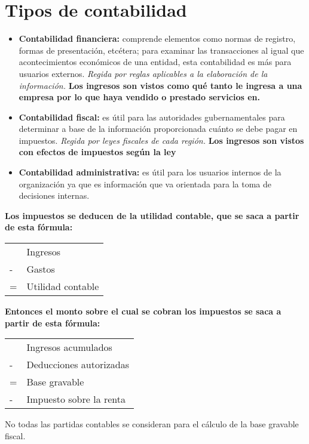 \documentclass{article}
\begin{document}
\section{Tipos de contabilidad}
\begin{itemize}
    \item \textbf{Contabilidad financiera:} comprende elementos como normas de registro, formas de presentación, etcétera; para examinar las transacciones al igual que acontecimientos económicos de una entidad, esta contabilidad es más para usuarios externos. \emph{Regida por reglas aplicables a la elaboración de la información.} \textbf{Los ingresos son vistos como qué tanto le ingresa a una empresa por lo que haya vendido o prestado servicios en.}
    \item \textbf{Contabilidad fiscal:} es útil para las autoridades gubernamentales para determinar a base de la información proporcionada cuánto se debe pagar en impuestos. \emph{Regida  por leyes fiscales de cada región.} \textbf{Los ingresos son vistos con efectos de impuestos según la ley}   
    \item \textbf{Contabilidad administrativa:} es útil para los usuarios internos de la organización ya que es información que va orientada para la toma de decisiones internas.
\end{itemize}

\textbf{Los impuestos se deducen de la utilidad contable, que se saca a partir de esta fórmula:}
\begin{center}
\begin{tabular}{ p{1cm}p{4cm} } 
&  Ingresos \\
-& Gastos \\  
 \hline
 =  & Utilidad contable 
\end{tabular}
\end{center}

\textbf{Entonces el monto sobre el cual se cobran los impuestos se saca a partir de esta fórmula:}
\begin{center}
\begin{tabular}{ p{1cm}p{5cm} } 
 &Ingresos acumulados  \\
-  & Deducciones autorizadas\\ 
 \hline
=  & Base gravable \\ 
- & Impuesto sobre la renta \\ 
\end{tabular}
\end{center}
No todas las partidas contables se consideran para el cálculo de la base gravable fiscal.
\end{document}
